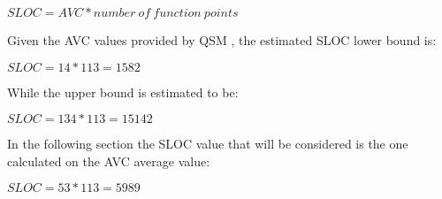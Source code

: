 \blindtext

\begin{center}
$SLOC = AVC * number \ of \ function \ points$
\end{center}
Given the AVC values provided by QSM \cite{avc_qsm}, the estimated SLOC lower bound is:
\begin{center}
$SLOC = 14 * 113 = 1582$
\end{center}
While the upper bound is estimated to be:
\begin{center}
$SLOC = 134 * 113 = 15142$
\end{center}
In the following section the SLOC value that will be considered is the one calculated on the AVC average value:
\begin{center}
$SLOC = 53 * 113 = 5989$
\end{center}
